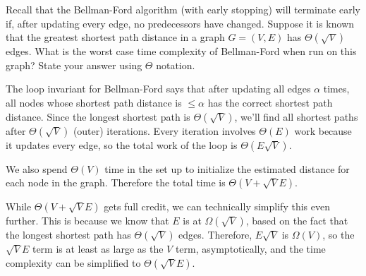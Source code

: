 \begin{prob}
    Recall that the Bellman-Ford algorithm (with early stopping) will terminate early
    if, after updating every edge, no predecessors have changed. Suppose it is
    known that the greatest shortest path distance in a graph $G = (V, E)$ has
    $\Theta(\sqrt{V})$ edges. What is the worst case time complexity of
    Bellman-Ford when run on this graph? State your answer using $\Theta$
    notation.

    \begin{soln}
        The loop invariant for Bellman-Ford says that after updating all edges $\alpha$
        times, all nodes whose shortest path distance is $\leq \alpha$ has the correct
        shortest path distance. Since the longest shortest path is $\Theta(\sqrt{V})$,
        we'll find all shortest paths after $\Theta(\sqrt{V})$ (outer) iterations. Every
        iteration involves $\Theta(E)$ work because it updates every edge, so the total work
        of the loop is $\Theta(E \sqrt{V})$.

        We also spend $\Theta(V)$ time in the set up to initialize the estimated distance
        for each node in the graph. Therefore the total time is $\Theta(V + \sqrt V E)$.

        While $\Theta(V + \sqrt V E)$ gets full credit, we can technically
        simplify this even further. This is because we know that $E$ is at
        $\Omega(\sqrt{V})$, based on the fact that the longest shortest path
        has $\Theta(\sqrt{V})$ edges. Therefore, $E \sqrt{V}$ is $\Omega(V)$,
        so the $\sqrt{V} E$ term is at least as large as the $V$ term,
        asymptotically, and the time complexity can be simplified to
        $\Theta(\sqrt{V} E)$.
    \end{soln}
\end{prob}
